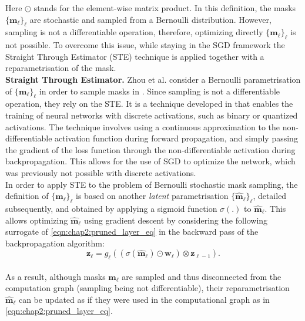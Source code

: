Here $\odot$ stands for the element-wise matrix product. In this definition, the
masks $\{\bm{m}_\ell\}_\ell$ are stochastic and sampled from a Bernoulli
distribution. However, sampling is not a differentiable operation, therefore,
optimizing directly $\{{\bm{m}_\ell}\}_\ell$ is not possible. To overcome this
issue, while staying in the \ac{SGD} framework the Straight Through Estimator
(STE) technique is applied together with a reparametrisation of the mask.\\

\noindent\textbf{Straight Through Estimator.} Zhou et
al. \cite{DBLP:conf/nips/ZhouLLY19} consider a Bernoulli parametrisation of
$\{\bm{m}_\ell\}_\ell$ in order to sample masks in
. Since sampling is not a differentiable
operation, they rely on the \ac{STE}. It is a technique developed in
\cite{DBLP:journals/corr/BengioLC13} that enables the training of neural
networks with discrete activations, such as binary or quantized activations. The
technique involves using a continuous approximation to the non-differentiable
activation function during forward propagation, and simply passing the gradient
of the loss function through the non-differentiable activation during
backpropagation. This allows for the use of \ac{SGD} to optimize the network,
which was previously not possible with discrete activations. \\

In order to apply \ac{STE} to the problem of Bernoulli stochastic mask
sampling, the definition of $\{\bm{m}_\ell\}_\ell$ is based on another
{\it latent} parametrisation $\{\bm{\hat{m}}_\ell\}_\ell$, detailed
subsequently, and obtained by applying a sigmoid function $\sigma(.)$ to
$\bm{\hat{m}}_\ell$. This allows optimizing $\bm{\hat{m}}_\ell$  using gradient
descent by considering the following surrogate of
\cref{eqn:chap2:pruned_layer_eq} in the backward pass of the backpropagation
algorithm:\\

\begin{equation}
  \label{eqn:chap2:pruned_layer_eq2}
  \mathbf{z}_{\ell} = g_\ell( ( \sigma(\bm{\hat{m}}_\ell) \odot \bm{w}_\ell ) \otimes \mathbf{z}_{\ell-1} ).
\end{equation} \\

\noindent As a result, although masks $\bm{m}_\ell$ are sampled and thus
disconnected from the computation graph (sampling being not differentiable),
their reparametrisation $\bm{\hat{m}}_\ell$ can be updated as if they were used in
the computational graph as in \cref{eqn:chap2:pruned_layer_eq}.\\



